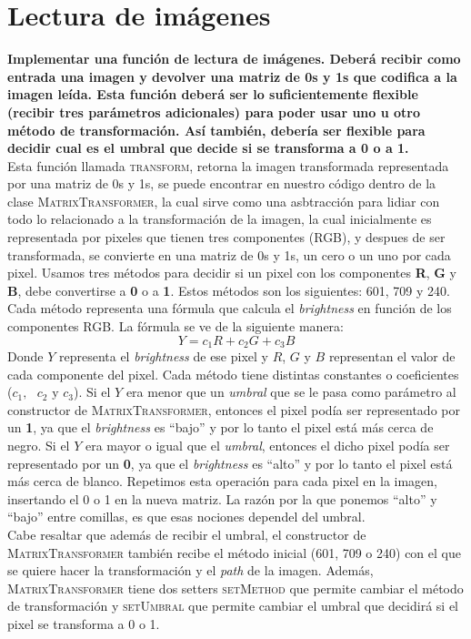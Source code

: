 \documentclass[12pt,a4,paper]{article}
\begin{document}
\section{Lectura de im\'agenes}
\textbf{Implementar una funci\'on de lectura de im\'agenes. Deber\'a recibir como entrada una imagen y devolver una matriz de 0s y 1s que codifica a la imagen le\'ida. Esta funci\'on deber\'a ser lo suficientemente flexible (recibir tres par\'ametros adicionales) para poder usar uno u otro m\'etodo de transformaci\'on. As\'i tambi\'en, deber\'ia ser flexible para decidir cual es el umbral que decide si se transforma a 0 o a 1.} \\

Esta función llamada \textsc{transform}, retorna la imagen transformada representada por una matriz de 0s y 1s, se puede encontrar en nuestro código dentro de la clase \textsc{MatrixTransformer}, la cual sirve como una asbtracción para lidiar con todo lo relacionado a la transformación de la imagen, la cual inicialmente es representada por pixeles que tienen tres componentes (RGB), y despues de ser transformada, se convierte en una matriz de 0s y 1s, un cero o un uno por cada pixel. Usamos tres métodos para decidir si un pixel con los componentes \textbf{R}, \textbf{G} y \textbf{B}, debe convertirse a \textbf{0} o a \textbf{1}. Estos métodos son los siguientes: 601, 709 y 240. Cada método representa una fórmula que calcula el \textit{brightness} en función de los componentes RGB. La fórmula se ve de la siguiente manera: $$Y = c_1R + c_2G + c_3B$$ Donde $Y$ representa el \textit{brightness} de ese pixel y $R$, $G$ y $B$ representan el valor de cada componente del pixel. Cada método tiene distintas constantes o coeficientes ($c_1,\text{ }c_2 \text{ y } c_3$). Si el $Y$ era menor que un \textit{umbral} que se le pasa como parámetro al constructor de \textsc{MatrixTransformer}, entonces el pixel podía ser representado por un \textbf{1}, ya que el \textit{brightness} es ``bajo'' y por lo tanto el pixel está más cerca de negro. Si el $Y$ era mayor o igual que el \textit{umbral}, entonces el dicho pixel podía ser representado por un \textbf{0}, ya que el \textit{brightness} es ``alto'' y por lo tanto el pixel está más cerca de blanco. Repetimos esta operación para cada pixel en la imagen, insertando el 0 o 1 en la nueva matriz. La razón por la que ponemos ``alto'' y ``bajo'' entre comillas, es que esas nociones dependel del umbral. \\
Cabe resaltar que además de recibir el umbral, el constructor de \textsc{MatrixTransformer} también recibe el método inicial (601, 709 o 240) con el que se quiere hacer la transformación y el \textit{path} de la imagen. Además, \textsc{MatrixTransformer} tiene dos setters \textsc{setMethod} que permite cambiar el método de transformación y \textsc{setUmbral} que permite cambiar el umbral que decidirá si el pixel se transforma a 0 o 1.\\
\end{document}
